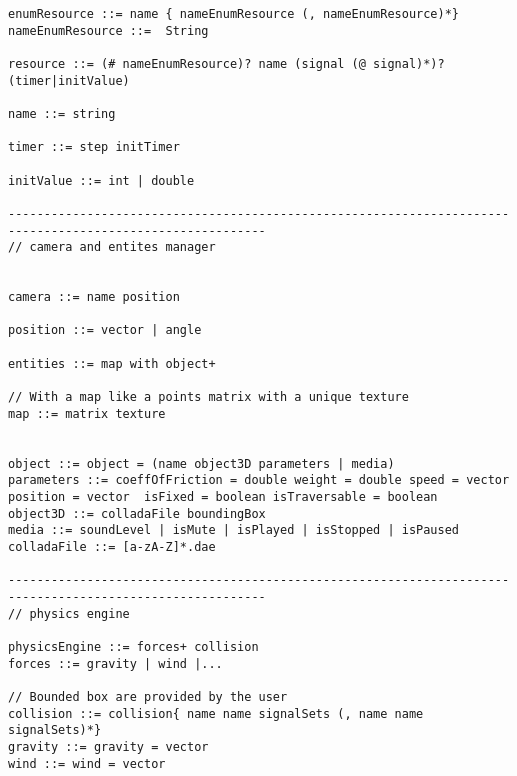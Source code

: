 \begin{lstlisting}[language=Grammar]
enumResource ::= name { nameEnumResource (, nameEnumResource)*}
nameEnumResource ::=  String

resource ::= (# nameEnumResource)? name (signal (@ signal)*)? (timer|initValue)

name ::= string

timer ::= step initTimer

initValue ::= int | double

----------------------------------------------------------------------------------------------------------
// camera and entites manager


camera ::= name position

position ::= vector | angle

entities ::= map with object+

// With a map like a points matrix with a unique texture
map ::= matrix texture


object ::= object = (name object3D parameters | media)
parameters ::= coeffOfFriction = double weight = double speed = vector position = vector  isFixed = boolean isTraversable = boolean
object3D ::= colladaFile boundingBox
media ::= soundLevel | isMute | isPlayed | isStopped | isPaused
colladaFile ::= [a-zA-Z]*.dae

----------------------------------------------------------------------------------------------------------
// physics engine

physicsEngine ::= forces+ collision
forces ::= gravity | wind |...

// Bounded box are provided by the user
collision ::= collision{ name name signalSets (, name name signalSets)*}
gravity ::= gravity = vector
wind ::= wind = vector


\end{lstlisting}
